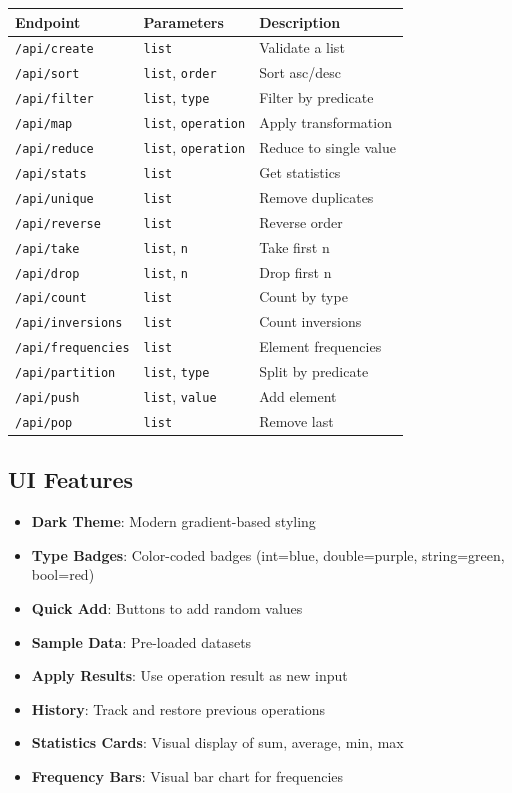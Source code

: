 \documentclass[11pt,a4paper]{article}
\begin{document}
\begin{center}
\small
\begin{longtable}{|l|l|p{6cm}|}
\hline
\textbf{Endpoint} & \textbf{Parameters} & \textbf{Description} \\
\hline
\texttt{/api/create} & \texttt{list} & Validate a list \\
\texttt{/api/sort} & \texttt{list}, \texttt{order} & Sort asc/desc \\
\texttt{/api/filter} & \texttt{list}, \texttt{type} & Filter by predicate \\
\texttt{/api/map} & \texttt{list}, \texttt{operation} & Apply transformation \\
\texttt{/api/reduce} & \texttt{list}, \texttt{operation} & Reduce to single value \\
\texttt{/api/stats} & \texttt{list} & Get statistics \\
\texttt{/api/unique} & \texttt{list} & Remove duplicates \\
\texttt{/api/reverse} & \texttt{list} & Reverse order \\
\texttt{/api/take} & \texttt{list}, \texttt{n} & Take first n \\
\texttt{/api/drop} & \texttt{list}, \texttt{n} & Drop first n \\
\texttt{/api/count} & \texttt{list} & Count by type \\
\texttt{/api/inversions} & \texttt{list} & Count inversions \\
\texttt{/api/frequencies} & \texttt{list} & Element frequencies \\
\texttt{/api/partition} & \texttt{list}, \texttt{type} & Split by predicate \\
\texttt{/api/push} & \texttt{list}, \texttt{value} & Add element \\
\texttt{/api/pop} & \texttt{list} & Remove last \\
\hline
\end{longtable}
\end{center}

\subsection{UI Features}

\begin{itemize}
    \item \textbf{Dark Theme}: Modern gradient-based styling
    \item \textbf{Type Badges}: Color-coded badges (int=blue, double=purple, string=green, bool=red)
    \item \textbf{Quick Add}: Buttons to add random values
    \item \textbf{Sample Data}: Pre-loaded datasets
    \item \textbf{Apply Results}: Use operation result as new input
    \item \textbf{History}: Track and restore previous operations
    \item \textbf{Statistics Cards}: Visual display of sum, average, min, max
    \item \textbf{Frequency Bars}: Visual bar chart for frequencies
\end{itemize}
\end{document}
